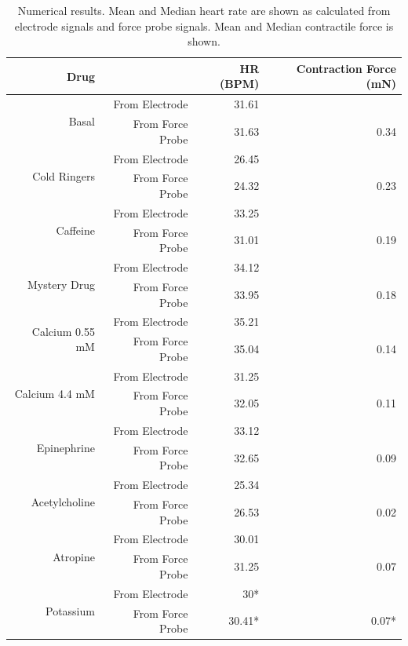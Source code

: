 \documentclass[12pt]{article}
\begin{document}



\begin{table}[H]
	\centering
	\caption{Numerical results. Mean and Median heart rate are shown as calculated from electrode signals and force probe signals. Mean and Median contractile force is shown.}\label{tab:stats}
	\begin{tabular}{|r r|r|r|}
		\hline
		Drug&&HR (BPM) & Contraction Force (mN) \\
		\hline
		\multirow{2}{*}{Basal}
		&From Electrode & 31.61 &  \\
		&From Force Probe & 31.63 & 0.34 \\
		\hline
		\multirow{2}{*}{Cold Ringers}
		&From Electrode & 26.45&   \\
		&From Force Probe & 24.32 & 0.23 \\
		\hline
		\multirow{2}{*}{Caffeine}
		&From Electrode & 33.25&   \\
		&From Force Probe & 31.01& 0.19 \\
		\hline
		\multirow{2}{*}{Mystery Drug}
		&From Electrode & 34.12 &   \\
		&From Force Probe &33.95 & 0.18  \\
		\hline
		\multirow{2}{*}{Calcium 0.55 mM}
		&From Electrode & 35.21 & \\
		&From Force Probe & 35.04 & 0.14 \\
		\hline
		
		\multirow{2}{*}{Calcium 4.4 mM}
		&From Electrode & 31.25 &   \\
		&From Force Probe & 32.05 & 0.11  \\
		\hline
		
		\multirow{2}{*}{Epinephrine }
		&From Electrode & 33.12 &  \\
		&From Force Probe & 32.65 & 0.09 \\
		\hline
		
		\multirow{2}{*}{Acetylcholine}
		&From Electrode & 25.34 &  \\
		&From Force Probe & 26.53 & 0.02  \\
		\hline
		
		\multirow{2}{*}{Atropine}
		&From Electrode & 30.01 &   \\
		&From Force Probe & 31.25 & 0.07 \\
		\hline
		
		\multirow{2}{*}{Potassium}
		&From Electrode & 30* &   \\
		&From Force Probe & 30.41* & 0.07*  \\
		\hline
		
	\end{tabular}
\end{table}
\end{document}
